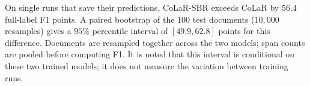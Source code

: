  On single runs that save their predictions, CoLaR-SBR exceeds CoLaR by $56.4$ full-label F1 points. A paired bootstrap of the $100$ test documents ($10{,}000$ resamples) gives a $95\%$ percentile interval of $[49.9, 62.8]$ points for this difference. Documents are resampled together across the two models; span counts are pooled before computing F1. It is noted that this interval is conditional on these two trained models; it does not measure the variation between training runs.
